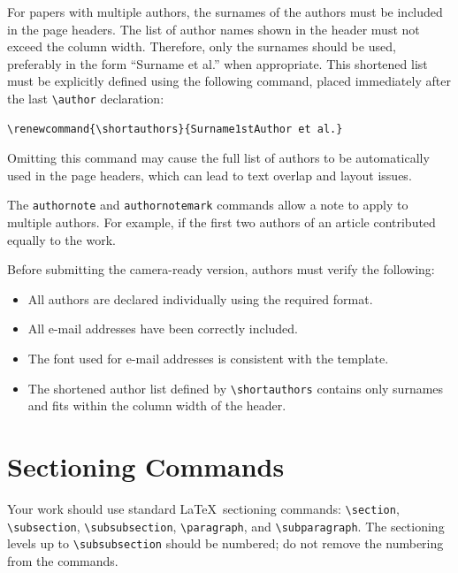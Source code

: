 \documentclass[sigconf]{acmart}
\begin{document}
For papers with multiple authors, the surnames of the authors must be included in the page headers. The list of author names shown in the header must not exceed the column width. Therefore, only the surnames should be used, preferably in the form ``Surname et al.'' when appropriate. This shortened list must be explicitly defined using the following command, placed immediately after the last \verb|\author| declaration:

\begin{verbatim}
\renewcommand{\shortauthors}{Surname1stAuthor et al.}
\end{verbatim}

Omitting this command may cause the full list of authors to be automatically used in the page headers, which can lead to text overlap and layout issues.

The \verb|authornote| and \verb|authornotemark| commands allow a note
to apply to multiple authors. For example, if the first two authors
of an article contributed equally to the work.

Before submitting the camera-ready version, authors must verify the following:
\begin{itemize}
  \item All authors are declared individually using the required format.
  \item All e-mail addresses have been correctly included.
  \item The font used for e-mail addresses is consistent with the template.
  \item The shortened author list defined by \verb|\shortauthors| contains only surnames and fits within the column width of the header.
\end{itemize}

\section{Sectioning Commands}

Your work should use standard \LaTeX\ sectioning commands:
\verb|\section|, \verb|\subsection|, \verb|\subsubsection|,
\verb|\paragraph|, and \verb|\subparagraph|. The sectioning levels up to
\verb|\subsubsection| should be numbered; do not remove the numbering
from the commands.
\end{document}
